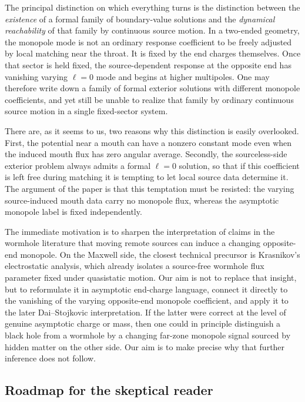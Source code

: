 \documentclass[aps,prd,onecolumn,nofootinbib,superscriptaddress]{revtex4-2}
\begin{document}
The principal distinction on which everything turns is the distinction between the \emph{existence} of a formal family of boundary-value solutions and the \emph{dynamical reachability} of that family by continuous source motion. In a two-ended geometry, the monopole mode is not an ordinary response coefficient to be freely adjusted by local matching near the throat. It is fixed by the end charges themselves. Once that sector is held fixed, the source-dependent response at the opposite end has vanishing varying $\ell=0$ mode and begins at higher multipoles. One may therefore write down a family of formal exterior solutions with different monopole coefficients, and yet still be unable to realize that family by ordinary continuous source motion in a single fixed-sector system.

There are, as it seems to us, two reasons why this distinction is easily overlooked. First, the potential near a mouth can have a nonzero constant mode even when the induced mouth flux has zero angular average. Secondly, the sourceless-side exterior problem always admits a formal $\ell=0$ solution, so that if this coefficient is left free during matching it is tempting to let local source data determine it. The argument of the paper is that this temptation must be resisted: the varying source-induced mouth data carry no monopole flux, whereas the asymptotic monopole label is fixed independently.

The immediate motivation is to sharpen the interpretation of claims in the wormhole literature that moving remote sources can induce a changing opposite-end monopole.\cite{DaiStojkovic2019Observing,DaiStojkovic2020ReplyObserving,SimonettiEtAl2021SensitiveSearches} On the Maxwell side, the closest technical precursor is Krasnikov's electrostatic analysis, which already isolates a source-free wormhole flux parameter fixed under quasistatic motion.\cite{Krasnikov2008ElectrostaticInteraction} Our aim is not to replace that insight, but to reformulate it in asymptotic end-charge language, connect it directly to the vanishing of the varying opposite-end monopole coefficient, and apply it to the later Dai--Stojkovic interpretation. If the latter were correct at the level of genuine asymptotic charge or mass, then one could in principle distinguish a black hole from a wormhole by a changing far-zone monopole signal sourced by hidden matter on the other side. Our aim is to make precise why that further inference does not follow.

\subsection*{Roadmap for the skeptical reader}
\end{document}
